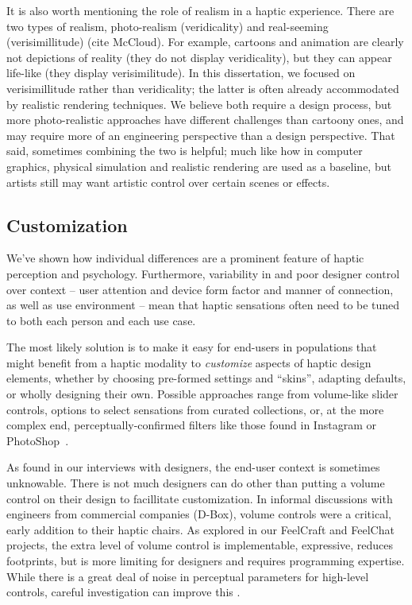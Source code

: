 It is also worth mentioning the role of realism in a haptic experience.
There are two types of realism, photo-realism (veridicality) and real-seeming (verisimillitude) (cite McCloud).
For example, cartoons and animation are clearly not depictions of reality (they do not display veridicality), but they can appear life-like (they display verisimilitude).
In this dissertation, we focused on verisimillitude rather than veridicality; the latter is often already accommodated by realistic rendering techniques.
We believe both require a design process, but more photo-realistic approaches have different challenges than cartoony ones, and may require more of an engineering perspective than a design perspective.
That said, sometimes combining the two is helpful; much like how in computer graphics, physical simulation and realistic rendering are used as a baseline, but artists still may want artistic control over certain scenes or effects.




\subsection{Customization}
\label{sec:conclusion:adaptableinterfaces}
We've shown how individual differences are a prominent feature of haptic perception and psychology.
Furthermore,  variability in and poor designer control over context --  user attention and  device form factor and manner of connection, as well as use environment -- mean that haptic sensations often need to be tuned to both each person and each use case.

The most likely solution   is to make it easy for end-users in populations that might benefit from a haptic modality to \textit{customize} aspects of haptic design elements, whether by choosing pre-formed settings and ``skins'', adapting defaults, or wholly designing their own. 
Possible approaches range from volume-like slider controls, options to select sensations from curated collections, or, at the more complex end, perceptually-confirmed filters like those found in Instagram or PhotoShop~\cite{Seifi2014,seifi2015vibviz,SchneiderAsiaHaptics2014}.


As found in our interviews with designers, the end-user context is sometimes unknowable.
There is not much designers can do other than putting a volume control on their design to facillitate customization.
In informal discussions with engineers from commercial companies (\eg D-Box), volume controls were a critical, early addition to their haptic chairs.
As explored in our FeelCraft and FeelChat projects, the extra level of volume control is implementable, expressive, reduces footprints, but is more limiting for designers and requires programming expertise.
While there is a great deal of noise in perceptual parameters for high-level controls, careful investigation can improve this \cite{Israr2014,Seifi2014}.



